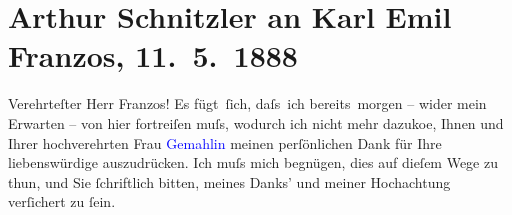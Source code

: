 

\renewcommand{\erwaehntePersonen}{Personen: Karl Emil Franzos, Ottilie Franzos}
\renewcommand{\erwaehnteOrte}{Orte: Berlin, London, Wien}
\renewcommand{\erwaehnteWerke}{Werke: Amerika, Erbschaft, Mein Freund Ypsilon. Aus den Papieren eines Arztes}
\section[Arthur Schnitzler an Karl Emil Franzos, 11. 5. 1888]{Arthur Schnitzler an Karl Emil Franzos, 11. 5. 1888}
\nopagebreak{}
\rehead{ }\normalsize\beginnumbering{}
\toendnotes[C]{\smallbreak\pagebreak[2]}
\toendnotes[C]{\smallbreak}
\pstart\center{}{\pb}Verehrteſter Herr Franzos!\pend
\pstart
           Es fügt ſich, daſs ich bereits morgen – wider mein Erwarten – von hier fortreiſen
               muſs, wodurch ich nicht mehr dazuko{\geminationm}e, Ihnen und Ihrer
               hochverehrten Frau \textcolor{blue}{Gemahlin}{}\ledrightnote{{$\rightarrow$}\textcolor{blue}{Ottilie Franzos}}
               meinen perſönlichen Dank für Ihre liebenswürdige \label{K_L03616-33v}\label{K_L03616-33h} auszudrücken. Ich muſs mich begnügen, dies auf dieſem
               Wege zu thun, und Sie ſchriftlich bitten, meines Danks’ und meiner Hochachtung
               verſichert zu ſein.\pend
           
